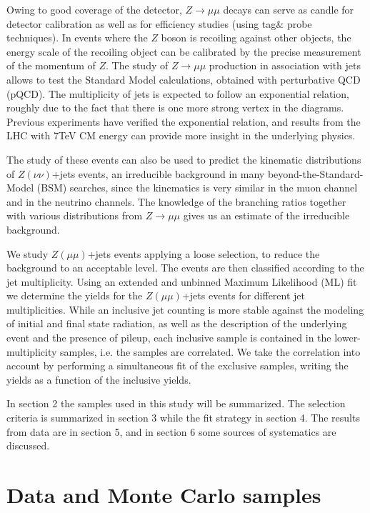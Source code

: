 \documentclass{cmspaper}
\begin{document}
Owing to good coverage of the detector, $Z\to \mu\mu$ decays can serve
as candle for detector calibration as well as for efficiency studies
(using tag$\&$ probe techniques). In events where the $Z$ boson is
recoiling against other objects, the energy scale of the recoiling
object can be calibrated by the precise measurement of the momentum of
$Z$.  The study of $Z\to \mu\mu$ production in association with jets
allows to test the Standard Model calculations, obtained with
perturbative QCD (pQCD). The multiplicity of jets is expected to
follow an exponential relation, roughly due to the fact that there is
one more strong vertex in the diagrams.  Previous experiments \cite{CDFMeasurement, D0Measurement} have
verified the exponential relation, and results
from the LHC with 7TeV CM energy can provide more insight in the
underlying physics.

The study of these events can also be used to predict the kinematic
distributions of $Z(\nu\nu)$+jets events, an irreducible background in
many beyond-the-Standard-Model (BSM) searches, since the kinematics is
very similar in the muon channel and in the neutrino channels.  The
knowledge of the branching ratios together with various distributions
from $Z\to\mu\mu$ gives us an estimate of the irreducible background.

We study $Z(\mu\mu)$+jets events applying a loose selection, to reduce
the background to an acceptable level. The events are then classified
according to the jet multiplicity. Using an extended and unbinned
Maximum Likelihood (ML) fit we determine the yields for the
$Z(\mu\mu)$+jets events for different jet multiplicities.  While an
inclusive jet counting is more stable against the modeling of initial
and final state radiation, as well as the description of the
underlying event and the presence of pileup, each inclusive sample
is contained in the lower-multiplicity samples, i.e. the samples are 
correlated. We take the correlation into account by performing
a simultaneous fit of the exclusive samples, writing the yields
as a function of the inclusive yields.

In section 2 the samples used in this study will be summarized.
The selection criteria is summarized in section 3 while the fit strategy in section 4.
The results from data are in section 5, and in section 6 some sources of systematics
are discussed.


\section{Data and Monte Carlo samples}
\end{document}
